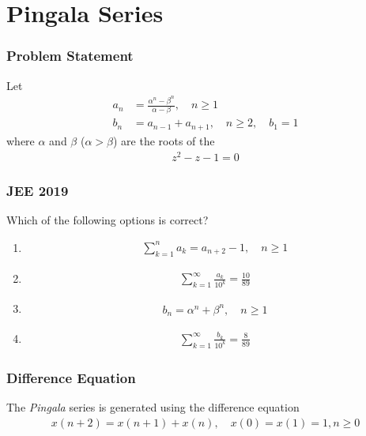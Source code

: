 \documentclass{beamer}
\providecommand{\brak}[1]{\ensuremath{\left(#1\right)}}
\theoremstyle{remark}
\numberwithin{equation}{section}
\begin{document}
\section{Pingala Series}
\begin{frame}
\frametitle{Problem Statement}
Let
\begin{align}
	\label{eq:pingala/10-orig-diff-a}
	a_n &= \frac{\alpha^{n}-\beta^{n}}{\alpha - \beta}, \quad n \ge 1
	\\
	b_n &= a_{n-1} + a_{n+1}, \quad n \ge 2, \quad b_1 =1
	\label{eq:pingala/10-orig-diff}
\end{align}
where $\alpha$ and $\beta$ ($\alpha > \beta$) are the roots of the
\begin{align}
z^2 - z - 1 = 0
\end{align}
%
\end{frame}
\begin{frame}
\frametitle{JEE 2019}
Which of the following options is correct?
\begin{enumerate}[label=\thesection.\arabic*,ref=\thesection.\theenumi]
\item 
	\label{itm:ping-1}
\begin{align}
	\label{eq:ping-1}
	\sum_{k=1}^{n}a_k = a_{n+2}-1, \quad n \ge 1
\end{align}
 \item 
	\label{itm:ping-2}
\begin{align}
	\label{eq:ping-2}
	\sum_{k=1}^{\infty}\frac{a_k}{10^k} =\frac{10}{89}
\end{align}
 \item 
	\label{itm:ping-3}
\begin{align}
	\label{eq:ping-3}
	b_n =\alpha^n + \beta^n, \quad n \ge 1
\end{align}
 \item 
	\label{itm:ping-4}
\begin{align}
	\label{eq:ping-4}
	\sum_{k=1}^{\infty}\frac{b_k}{10^k} =\frac{8}{89}
\end{align}
\end{enumerate}
\end{frame}
\begin{frame}
\frametitle{Difference Equation}
The {\em Pingala} series is generated using the difference equation 
\begin{align}
	x(n+2) = x\brak{n+1} + x\brak{n},  \quad x(0) = x(1) = 1, n \ge 0
	\label{eq:pingala/10-pingala}
\end{align}
\end{frame}
\end{document}
